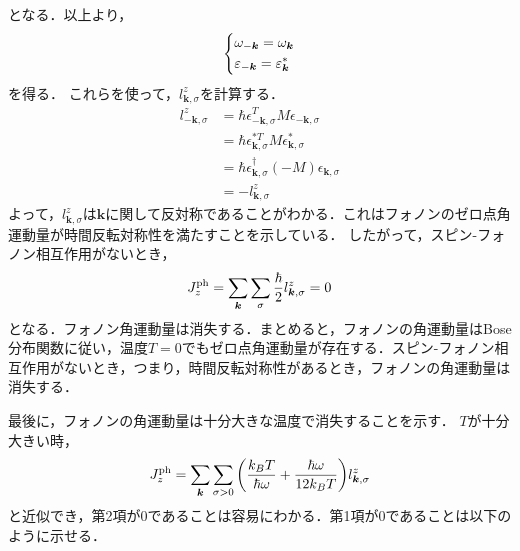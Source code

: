 \documentclass{report}
\begin{document}
となる．以上より，
\begin{align}
  \begin{dcases}
    \omega_{-\bm{k}} = \omega_{\bm{k}}\\
    \varepsilon_{-\bm{k}} = \varepsilon_{\bm{k}}^{*}
  \end{dcases}
\end{align}
を得る．
これらを使って，$l_{\bm{k},\sigma}^z$を計算する．
\begin{align}
  l_{-\bm{k},\sigma}^z &= \hbar \epsilon_{-\bm{k},\sigma}^T M \epsilon_{-\bm{k},\sigma}\\
  &= \hbar \epsilon_{\bm{k},\sigma}^{*T} M \epsilon_{\bm{k},\sigma}^{*}\\
  &= \hbar \epsilon_{\bm{k},\sigma}^{\dagger}(-M)\epsilon_{\bm{k},\sigma}\\
  &= -l_{\bm{k},\sigma}^z
\end{align}
よって，$l_{\bm{k},\sigma}^z$は$\bm{k}$に関して反対称であることがわかる．これはフォノンのゼロ点角運動量が時間反転対称性を満たすことを示している．
したがって，スピン-フォノン相互作用がないとき，
\begin{align}
  J_z^{\mathrm{ph}} = \sum_{\bm{k}}\sum_{\sigma} \frac{\hbar}{2} l_{\bm{k},\sigma}^{z} = 0
\end{align}
となる．フォノン角運動量は消失する．まとめると，フォノンの角運動量はBose分布関数に従い，温度$T=0$でもゼロ点角運動量が存在する．スピン-フォノン相互作用がないとき，つまり，時間反転対称性があるとき，フォノンの角運動量は消失する．

最後に，フォノンの角運動量は十分大きな温度で消失することを示す．
$T$が十分大きい時，
\begin{align}
  J_z^{\mathrm{ph}} = \sum_{\bm{k}}\sum_{\sigma > 0} \qty(\frac{k_B T}{\hbar\omega} + \frac{\hbar\omega}{12k_B T}) l_{\bm{k},\sigma}^{z} \label{angular-temperature}
\end{align}
と近似でき，第2項が0であることは容易にわかる．第1項が0であることは以下のように示せる．
\end{document}
